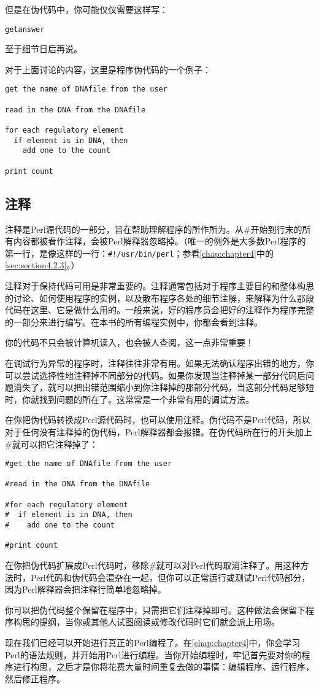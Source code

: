 但是在伪代码中，你可能仅仅需要这样写：

\begin{lstlisting}
getanswer
\end{lstlisting}

至于细节日后再说。

对于上面讨论的内容，这里是程序伪代码的一个例子：

\begin{lstlisting}
get the name of DNAfile from the user

read in the DNA from the DNAfile

for each regulatory element
  if element is in DNA, then
    add one to the count

print count
\end{lstlisting}

\subsection{注释}
注释是Perl源代码的一部分，旨在帮助理解程序的所作所为。从\#开始到行末的所有内容都被看作注释，会被Perl解释器忽略掉。（唯一的例外是大多数Perl程序的第一行，是像这样的一行：\verb|#!/usr/bin/perl|；参看\autoref{chap:chapter4}中的\autoref{sec:section4.2.3}。）

注释对于保持代码可用是非常重要的。注释通常包括对于程序主要目的和整体构思的讨论、如何使用程序的实例，以及散布程序各处的细节注解，来解释为什么那段代码在这里、它是做什么用的。一般来说，好的程序员会把好的注释作为程序完整的一部分来进行编写。在本书的所有编程实例中，你都会看到注释。

你的代码不只会被计算机读入，也会被人查阅，这一点非常重要！

在调试行为异常的程序时，注释往往非常有用。如果无法确认程序出错的地方，你可以尝试选择性地注释掉不同部分的代码。如果你发现当注释掉某一部分代码后问题消失了，就可以把出错范围缩小到你注释掉的那部分代码，当这部分代码足够短时，你就找到问题的所在了。这常常是一个非常有用的调试方法。

在你把伪代码转换成Perl源代码时，也可以使用注释。伪代码不是Perl代码，所以对于任何没有注释掉的伪代码，Perl解释器都会报错。在伪代码所在行的开头加上\#就可以把它注释掉了：

\begin{lstlisting}
#get the name of DNAfile from the user

#read in the DNA from the DNAfile

#for each regulatory element
#  if element is in DNA, then
#    add one to the count

#print count
\end{lstlisting}

在你把伪代码扩展成Perl代码时，移除\#就可以对Perl代码取消注释了。用这种方法时，Perl代码和伪代码会混杂在一起，但你可以正常运行或测试Perl代码部分，因为Perl解释器会把注释行简单地忽略掉。

你可以把伪代码整个保留在程序中，只需把它们注释掉即可。这种做法会保留下程序构思的提纲，当你或其他人试图阅读或修改代码时它们就会派上用场。

现在我们已经可以开始进行真正的Perl编程了。在\autoref{chap:chapter4}中，你会学习Perl的语法规则，并开始用Perl进行编程。当你开始编程时，牢记首先要对你的程序进行构思，之后才是你将花费大量时间重复去做的事情：编辑程序、运行程序，然后修正程序。
